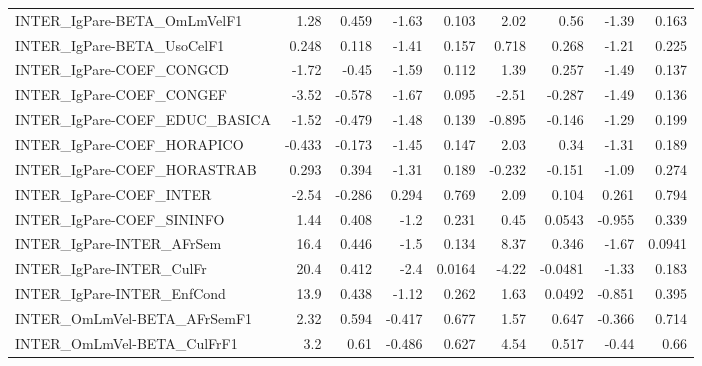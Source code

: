 \begin{tabular}{lrrrrrrrr}
INTER\_IgPare-BETA\_OmLmVelF1           &        1.28 &        0.459 &   -1.63 &    0.103 &       2.02 &        0.56 &        -1.39 &         0.163 \\
INTER\_IgPare-BETA\_UsoCelF1            &       0.248 &        0.118 &   -1.41 &    0.157 &      0.718 &       0.268 &        -1.21 &         0.225 \\
INTER\_IgPare-COEF\_CONGCD              &       -1.72 &        -0.45 &   -1.59 &    0.112 &       1.39 &       0.257 &        -1.49 &         0.137 \\
INTER\_IgPare-COEF\_CONGEF              &       -3.52 &       -0.578 &   -1.67 &    0.095 &      -2.51 &      -0.287 &        -1.49 &         0.136 \\
INTER\_IgPare-COEF\_EDUC\_BASICA         &       -1.52 &       -0.479 &   -1.48 &    0.139 &     -0.895 &      -0.146 &        -1.29 &         0.199 \\
INTER\_IgPare-COEF\_HORAPICO            &      -0.433 &       -0.173 &   -1.45 &    0.147 &       2.03 &        0.34 &        -1.31 &         0.189 \\
INTER\_IgPare-COEF\_HORASTRAB           &       0.293 &        0.394 &   -1.31 &    0.189 &     -0.232 &      -0.151 &        -1.09 &         0.274 \\
INTER\_IgPare-COEF\_INTER               &       -2.54 &       -0.286 &   0.294 &    0.769 &       2.09 &       0.104 &        0.261 &         0.794 \\
INTER\_IgPare-COEF\_SININFO             &        1.44 &        0.408 &    -1.2 &    0.231 &       0.45 &      0.0543 &       -0.955 &         0.339 \\
INTER\_IgPare-INTER\_AFrSem             &        16.4 &        0.446 &    -1.5 &    0.134 &       8.37 &       0.346 &        -1.67 &        0.0941 \\
INTER\_IgPare-INTER\_CulFr              &        20.4 &        0.412 &    -2.4 &   0.0164 &      -4.22 &     -0.0481 &        -1.33 &         0.183 \\
INTER\_IgPare-INTER\_EnfCond            &        13.9 &        0.438 &   -1.12 &    0.262 &       1.63 &      0.0492 &       -0.851 &         0.395 \\
INTER\_OmLmVel-BETA\_AFrSemF1           &        2.32 &        0.594 &  -0.417 &    0.677 &       1.57 &       0.647 &       -0.366 &         0.714 \\
INTER\_OmLmVel-BETA\_CulFrF1            &         3.2 &         0.61 &  -0.486 &    0.627 &       4.54 &       0.517 &        -0.44 &          0.66 \\

\end{tabular}
